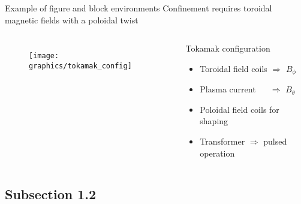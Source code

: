\documentclass{beamer}
\begin{document}
\begin{frame}{Example of figure and block environments}
 Confinement requires toroidal magnetic fields with a poloidal twist
\begin{columns}
    \begin{figure} 
    \texttt{[image: graphics/tokamak\_config]}
    \end{figure}

    \begin{block}{Tokamak configuration}
      \begin{itemize}
        \item Toroidal field coils $\Rightarrow$ $B_{\phi}$
        \item Plasma current $\quad \,\,\Rightarrow$ $B_{\theta}$
        \item Poloidal field coils for shaping
        \item Transformer $\Rightarrow$ pulsed operation
      \end{itemize}
    \end{block}
  \end{columns}




\end{frame}


\subsection{Subsection 1.2}

\end{document}
